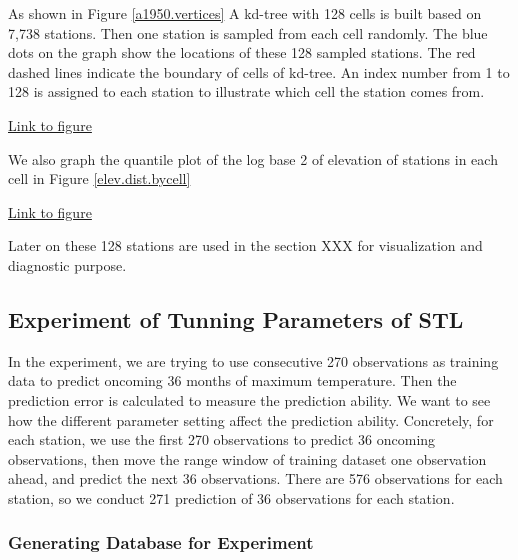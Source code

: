 As shown in Figure \href{../plots/vertices.a1950.pdf}{\ref*{a1950.vertices}}
A kd-tree with 128 cells is built based on 7,738 stations. Then one station is 
sampled from each cell randomly. The blue dots on the graph show the locations 
of these 128 sampled stations. The red dashed lines indicate the boundary of cells 
of kd-tree. An index number from 1 to 128 is assigned to each station to 
illustrate which cell the station comes from. 

\begin{framed}
\begin{center}
  \href{../plots/vertices.a1950.pdf}{Link to figure}
  \label{a1950.vertices}
\end{center}
\end{framed}

We also graph the quantile plot of the log base 2 of elevation of stations in each
cell in Figure \href{../plots/elev.dist.bycell.pdf}{\ref*{elev.dist.bycell}}

\begin{framed}
\begin{center}
  \href{../plots/elev.dist.bycell.pdf}{Link to figure}
  \label{elev.dist.bycell}
\end{center}
\end{framed}

Later on these 128 stations are used in the section XXX for visualization and 
diagnostic purpose.

\subsection{Experiment of Tunning Parameters of STL}

In the experiment, we are trying to use consecutive 270 observations as training 
data to predict oncoming 36 months of maximum temperature. Then the prediction 
error is calculated to measure the prediction ability. 
We want to see how the different parameter setting affect 
the prediction ability. Concretely, for each station, we use the first 270 
observations to predict 36 oncoming observations, then move the range window of 
training dataset one observation ahead, and predict the next 36 observations. 
There are 576 observations for each station, so we conduct 271 prediction of 36
observations for each station.

\subsubsection{Generating Database for Experiment}

